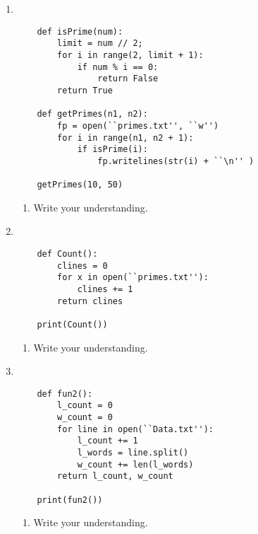 \documentclass[11pt,a4paper]{article}
\def\AnswerBox{\fbox{\begin{minipage}{4in}\hfill\vspace{0.5in}\end{minipage}}}
\begin{document}
\begin{enumerate}[label=\bfseries Program \arabic*:]

    \item ~
    \begin{lstlisting}
    def isPrime(num):
        limit = num // 2;
        for i in range(2, limit + 1):
            if num % i == 0:
                return False
        return True

    def getPrimes(n1, n2):
        fp = open(``primes.txt'', ``w'')
        for i in range(n1, n2 + 1):
            if isPrime(i):
                fp.writelines(str(i) + ``\n'' )

    getPrimes(10, 50)

    \end{lstlisting}
    \AnswerBox
    \begin{enumerate}[label=\bfseries Q\arabic*:]\itemsep10pt
         \item Write your understanding.\vspace{1cm}
    \end{enumerate}

    \item ~
    \begin{lstlisting}
    def Count():
        clines = 0
        for x in open(``primes.txt''):
            clines += 1
        return clines

    print(Count())
    \end{lstlisting}
    \AnswerBox 
    \begin{enumerate}[label=\bfseries Q\arabic*:]\itemsep10pt
         \item Write your understanding.\vspace{1cm}
    \end{enumerate}
    \item ~
    \begin{lstlisting}
    def fun2():
        l_count = 0
        w_count = 0 
        for line in open(``Data.txt''):
            l_count += 1
            l_words = line.split()
            w_count += len(l_words)
        return l_count, w_count

    print(fun2())
    \end{lstlisting}
    \AnswerBox
    \begin{enumerate}[label=\bfseries Q\arabic*:]\itemsep10pt
         \item Write your understanding.\vspace{2cm}
    \end{enumerate} 



\end{enumerate}
\end{document}
